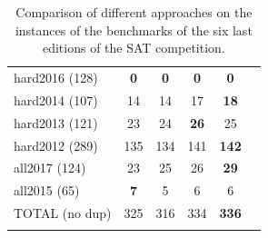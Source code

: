 \begin{table}
{{\begin{tabular}{l|ccccc}
    hard2016 (128) & \cellcolor{gray!30}\textbf{0} & \cellcolor{gray!30}\textbf{0} & \cellcolor{gray!30}\textbf{0} & \cellcolor{gray!30}\textbf{0}\\
    hard2014 (107) & 14 & 14 & 17 & \cellcolor{gray!30}\textbf{18}\\
    hard2013 (121) & 23 & 24 & \cellcolor{gray!30}\textbf{26} & 25\\
    hard2012 (289) & 135 & 134 & 141 & \cellcolor{gray!30}\textbf{142}\\
    \hline
    all2017 (124) & 23 & 25 & 26 & \cellcolor{gray!30}\textbf{29}\\
    all2015 (65) & \cellcolor{gray!30}\textbf{7} & 5 & 6 & 6\\
    \hline
    TOTAL (no dup) & 325 & 316 & 334 & \cellcolor{gray!30}\textbf{336}\\
    \label{table:sat:bliss}
   \end{tabular}
  }
 }
 \vspace*{0.1cm}
 \caption{Comparison of different approaches on the \sat instances of the benchmarks of the six last editions of the SAT competition.}
 \label{table:benchSAT}
\end{table}
\begin{table}[h!]
 \centering\footnotesize
 \hspace{1em}
 \vspace*{0.1cm}
 \caption{Comparison of PAR-2 times (in seconds) of the benchmarks on the six last editions of the SAT competition.}
 \label{tab:par2}
\end{table}
